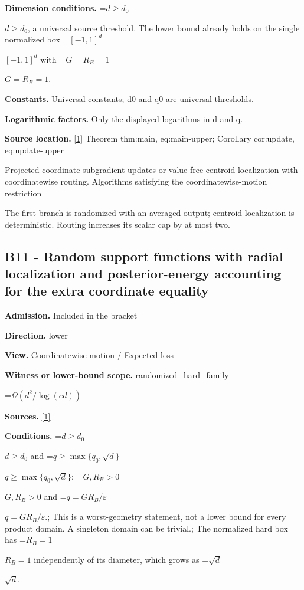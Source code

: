 \documentclass[10pt,a4paper]{article}
\newcommand{\AtlasMath}[1]{\par\begingroup\centering\setbox0=\hbox{$\displaystyle #1$}\ifdim\wd0>1.4\linewidth\typeout{ATLAS WIDE FORMULA: \the\wd0}\fi\ifdim\wd0>\linewidth\resizebox{\linewidth}{!}{\box0}\else\box0\fi\par\endgroup}
\newcommand{\AtlasInlineMath}[1]{\begingroup\setbox0=\hbox{$#1$}\ifdim\wd0>.4\linewidth\endgroup\AtlasMath{#1}\else\endgroup$#1$\fi}
\begin{document}
\textbf{Dimension conditions.} \AtlasInlineMath{d\ge d_0}, a universal source threshold. The lower bound already holds on the single normalized box \AtlasInlineMath{[-1,1]^d} with \AtlasInlineMath{G=R_B=1}.



\textbf{Constants.} Universal constants; d0 and q0 are universal thresholds.



\textbf{Logarithmic factors.} Only the displayed logarithms in d and q.



\textbf{Source location.} \href{https://github.com/WU-Wendao/Colombo/blob/main/colombo_sensorium/Complexity_altas/data/sources/colombo/U03/manuscript.pdf}{[1]} Theorem thm:main, eq:main-upper; Corollary cor:update, eq:update-upper



Projected coordinate subgradient updates or value-free centroid localization with coordinatewise routing. Algorithms satisfying the coordinatewise-motion restriction



The first branch is randomized with an averaged output; centroid localization is deterministic. Routing increases its scalar cap by at most two.



\subsection{B11 - Random support functions with radial localization and posterior-energy accounting for the extra coordinate equality}


\textbf{Admission.} Included in the bracket



\textbf{Direction.} lower



\textbf{View.} Coordinatewise motion / Expected loss



\textbf{Witness or lower-bound scope.} randomized\_hard\_family



\AtlasMath{\Omega(d^2/\log(ed))}


\textbf{Sources.} \href{https://github.com/WU-Wendao/Colombo/blob/main/colombo_sensorium/Complexity_altas/data/sources/colombo/U03/manuscript.pdf}{[1]}



\textbf{Conditions.} \AtlasInlineMath{d\ge d_0} and \AtlasInlineMath{q\ge\max\{q_0,\sqrt d\}}; \AtlasInlineMath{G,R_B>0} and \AtlasInlineMath{q=GR_B/\varepsilon}.; This is a worst-geometry statement, not a lower bound for every product domain. A singleton domain can be trivial.; The normalized hard box has \AtlasInlineMath{R_B=1} independently of its diameter, which grows as \AtlasInlineMath{\sqrt d}.
\end{document}
